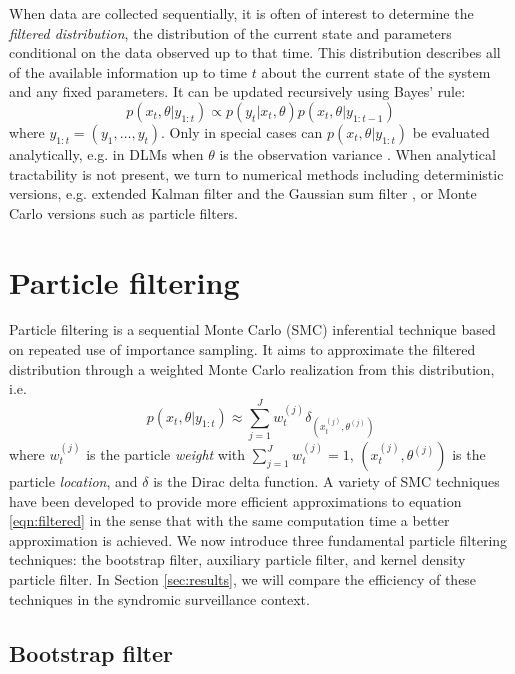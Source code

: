 \documentclass{elsarticle}
\begin{document}
When data are collected sequentially, it is often of interest to determine the \emph{filtered distribution}, the distribution of the current state and parameters conditional on the data observed up to that time. This distribution describes all of the available information up to time $t$ about the current state of the system and any fixed parameters. It can be updated recursively using Bayes' rule:
\begin{equation}
p(x_t,\theta| y_{1:t}) \propto p(y_t|x_t,\theta)p(x_t,\theta|y_{1:t-1}) \label{eqn:filtered}
\end{equation}
where $y_{1:t} = (y_1,\ldots,y_t)$. Only in special cases can $p(x_t,\theta| y_{1:t})$ be evaluated analytically, e.g. in DLMs when $\theta$ is the observation variance \cite[Sec 4.3,][]{petris2009dynamic}. When analytical tractability is not present, we turn to numerical methods including deterministic versions, e.g. extended Kalman filter and the Gaussian sum filter \citep{Alsp:Sore:nonl:1972}, or Monte Carlo versions such as particle filters.

\section{Particle filtering \label{sec:filtering}}

Particle filtering is a sequential Monte Carlo (SMC) inferential technique based on repeated use of importance sampling. It aims to approximate the filtered distribution through a weighted Monte Carlo realization from this distribution, i.e.
\begin{equation}
p(x_t,\theta| y_{1:t}) \approx \sum_{j=1}^J w_t^{(j)} \delta_{\left(x_t^{(j)},\theta^{(j)}\right)} \label{eqn:approx}
\end{equation}
where $w_t^{(j)}$ is the particle \emph{weight} with $\sum_{j=1}^J w_t^{(j)}=1$, $\left(x_t^{(j)},\theta^{(j)}\right)$ is the particle \emph{location}, and $\delta$ is the Dirac delta function. A variety of SMC techniques have been developed to provide more efficient approximations to equation \eqref{eqn:filtered} in the sense that with the same computation time a better approximation is achieved. We now introduce three fundamental particle filtering techniques: the bootstrap filter, auxiliary particle filter, and kernel density particle filter. In Section \ref{sec:results}, we will compare the efficiency of these techniques in the syndromic surveillance context.

\subsection{Bootstrap filter \label{sec:bf}}
\end{document}
